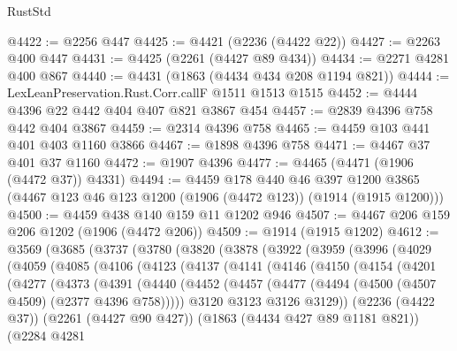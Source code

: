 \begin{lexlean}{RustStd}
\begin{coremodule}
@4422 := @2256 @447
@4425 := @4421 (@2236 (@4422 @22))
@4427 := @2263 @400 @447
@4431 := @4425 (@2261 (@4427 @89 @434))
@4434 := @2271 @4281 @400 @867
@4440 := @4431 (@1863 (@4434 @434 @208 @1194 @821))
@4444 := LexLeanPreservation.Rust.Corr.callF @1511 @1513 @1515
@4452 := @4444 @4396 @22 @442 @404 @407 @821 @3867 @454
@4457 := @2839 @4396 @758 @442 @404 @3867
@4459 := @2314 @4396 @758
@4465 := @4459 @103 @441 @401 @403 @1160 @3866
@4467 := @1898 @4396 @758
@4471 := @4467 @37 @401 @37 @1160
@4472 := @1907 @4396
@4477 := @4465 (@4471 (@1906 (@4472 @37)) @4331)
@4494 := @4459
    @178
    @440
    @46
    @397
    @1200
    @3865
    (@4467 @123 @46 @123 @1200 (@1906 (@4472 @123)) (@1914 (@1915 @1200)))
@4500 := @4459 @438 @140 @159 @11 @1202 @946
@4507 := @4467 @206 @159 @206 @1202 (@1906 (@4472 @206))
@4509 := @1914 (@1915 @1202)
@4612 := @3569
    (@3685
      (@3737
        (@3780
          (@3820
            (@3878
              (@3922
                (@3959
                  (@3996
                    (@4029
                      (@4059
                        (@4085
                          (@4106
                            (@4123
                              (@4137
                                (@4141
                                  (@4146
                                    (@4150
                                      (@4154
                                        (@4201
                                          (@4277
                                            (@4373
                                              (@4391
                                                (@4440
                                                  (@4452
                                                    (@4457
                                                      (@4477
                                                        (@4494
                                                          (@4500
                                                            (@4507 @4509)
                                                            (@2377 @4396 @758)))))
                                                    @3120
                                                    @3123
                                                    @3126
                                                    @3129))
                                                (@2236 (@4422 @37))
                                                (@2261 (@4427 @90 @427))
                                                (@1863 (@4434 @427 @89 @1181 @821))
                                                (@2284
                                                  @4281

\end{coremodule}
\end{lexlean}

